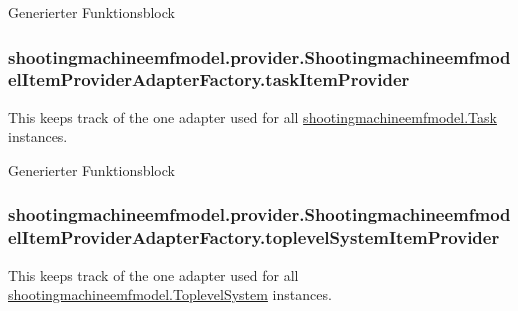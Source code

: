 Generierter Funktionsblock \hypertarget{classshootingmachineemfmodel_1_1provider_1_1_shootingmachineemfmodel_item_provider_adapter_factory_a613779bbd8c39fdae4027b22f1b63670}{
\subsubsection[{task\-Item\-Provider}]{ shootingmachineemfmodel.\-provider.\-Shootingmachineemfmodel\-Item\-Provider\-Adapter\-Factory.\-task\-Item\-Provider\hspace{0.3cm}{\ttfamily [protected]}}}\label{classshootingmachineemfmodel_1_1provider_1_1_shootingmachineemfmodel_item_provider_adapter_factory_a613779bbd8c39fdae4027b22f1b63670}
This keeps track of the one adapter used for all \hyperlink{interfaceshootingmachineemfmodel_1_1_task}{shootingmachineemfmodel.\-Task} instances.

Generierter Funktionsblock \hypertarget{classshootingmachineemfmodel_1_1provider_1_1_shootingmachineemfmodel_item_provider_adapter_factory_a35dd7e0b671c7f06296cde3c2923f2ed}{
\subsubsection[{toplevel\-System\-Item\-Provider}]{ shootingmachineemfmodel.\-provider.\-Shootingmachineemfmodel\-Item\-Provider\-Adapter\-Factory.\-toplevel\-System\-Item\-Provider\hspace{0.3cm}{\ttfamily [protected]}}}\label{classshootingmachineemfmodel_1_1provider_1_1_shootingmachineemfmodel_item_provider_adapter_factory_a35dd7e0b671c7f06296cde3c2923f2ed}
This keeps track of the one adapter used for all \hyperlink{interfaceshootingmachineemfmodel_1_1_toplevel_system}{shootingmachineemfmodel.\-Toplevel\-System} instances.

